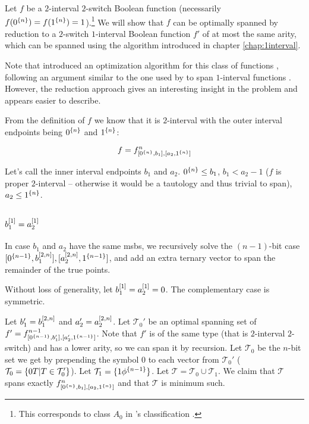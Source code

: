 \newcommand{\ftwointtwoswitch}[4]
{#1^{#2}_{\interval{\rep{0}{#2}}{#3},
\interval{#4}{\rep{1}{#2}}}}

\newcommand{\fnba}{\ftwointtwoswitch{f}{n}{b_1}{a_2}}

Let $f$ be a $2$-interval $2$-switch Boolean function
(necessarily $f(0^{\{n\}}) = f(1^{\{n\}})
= 1$).\footnote{This corresponds to class $A_0$
in \citeauthor{Dubovsky2012}'s classification
\citep[p.~5]{Dubovsky2012}.}
We will show that $f$
can be optimally spanned by reduction to
a $2$-switch $1$-interval Boolean function $f'$
of at most the same arity,
which can be spanned using the algorithm introduced
in chapter \ref{chap:1interval}.

Note that
\citeauthor{Dubovsky2012} introduced an optimization algorithm for
this class of functions \citep[section 3.2]{Dubovsky2012},
following an argument similar to the one used by
\citeauthor{Schieber2005154} to span $1$-interval functions
\citep{Schieber2005154}.
However,
the reduction approach gives
an interesting insight in the problem
and appears easier to describe.

From the definition of $f$ we know that it is $2$-interval
with the outer interval endpoints being
$0^{\{n\}}$ and $1^{\{n\}}$:

\[
f = \fnba
\]

Let's call the inner interval endpoints $b_1$ and $a_2$.
$0^{\{n\}} \leq b_1$,
$b_1 < a_2 - 1$ ($f$ is proper $2$-interval
-- otherwise it would be a tautology
and thus trivial to span),
$a_2 \leq 1^{\{n\}}$.

\subsection{\texorpdfstring{$b_1^{[1]} = a_2^{[1]}$}
{ = }
}

In case $b_1$ and $a_2$ have the same \acrshort{msb}s,
we recursively solve the $(n-1)$-bit
case
$[0^{\{n-1\}}, b_1^{[2, n]}],
[a_2^{[2, n]}, 1^{\{n-1\}}]$,
and add an extra ternary vector to span the remainder
of the true points.

Without loss of generality,
let $b_1^{[1]} = a_2^{[1]} = 0$.
The complementary case is symmetric.

Let $b_1' = b_1^{[2, n]}$
and $a_2' = a_2^{[2, n]}$.
Let $\mathcal{T}_0'$ be an optimal spanning set of
$f' = \ftwointtwoswitch{f}{n-1}{b_1'}{a_2'}$.
Note that $f'$ is of the same type
(that is $2$-interval $2$-switch)
and has a lower arity,
so we can span it by recursion.
Let $\mathcal{T}_0$ be the $n$-bit set we get
by prepending the symbol $0$
to each vector from $\mathcal{T}_0'$
($\mathcal{T}_0 = \{0 T | T \in \mathcal{T}_0'\}$).
Let $\mathcal{T}_1 = \{1 \phi^{\{n-1\}}\}$.
Let $\mathcal{T} = \mathcal{T}_0 \cup \mathcal{T}_1$.
We claim that $\mathcal{T}$ spans exactly
$\fnba$
and that $\mathcal{T}$ is minimum such.

